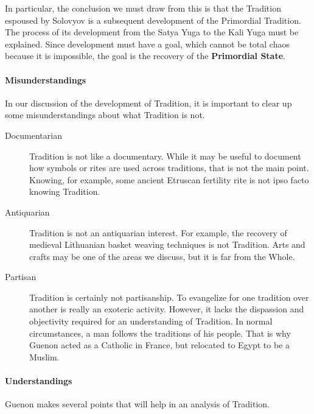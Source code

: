 In particular, the conclusion we must draw from this is that the Tradition espoused by Solovyov is a subsequent development of the Primordial Tradition. The process of its development from the Satya Yuga to the Kali Yuga must be explained. Since development must have a goal, which cannot be total chaos because it is impossible, the goal is the recovery of the \textbf{Primordial State}.

\paragraph{Misunderstandings}

In our discussion of the development of Tradition, it is important to clear up some misunderstandings about what Tradition is not.

\begin{description}

\item[Documentarian]

Tradition is not like a documentary. While it may be useful to document how symbols or rites are used across traditions, that is not the main point. Knowing, for example, some ancient Etruscan fertility rite is not ipso facto knowing Tradition.
\item[Antiquarian]

Tradition is not an antiquarian interest. For example, the recovery of medieval Lithuanian basket weaving techniques is not Tradition. Arts and crafts may be one of the areas we discuss, but it is far from the Whole.
\item[Partisan]

Tradition is certainly not partisanship. To evangelize for one tradition over another is really an exoteric activity. However, it lacks the dispassion and objectivity required for an understanding of Tradition. In normal circumstances, a man follows the traditions of his people. That is why Guenon acted as a Catholic in France, but relocated to Egypt to be a Muslim.
\end{description}


\paragraph{Understandings}


Guenon makes several points that will help in an analysis of Tradition.

